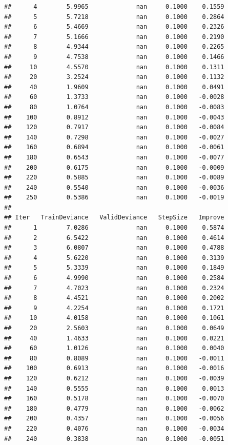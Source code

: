 \documentclass[
]{book}
\begin{document}
\begin{verbatim}
##      4        5.9965             nan     0.1000    0.1559
##      5        5.7218             nan     0.1000    0.2864
##      6        5.4669             nan     0.1000    0.2326
##      7        5.1666             nan     0.1000    0.2190
##      8        4.9344             nan     0.1000    0.2265
##      9        4.7538             nan     0.1000    0.1466
##     10        4.5570             nan     0.1000    0.1311
##     20        3.2524             nan     0.1000    0.1132
##     40        1.9609             nan     0.1000    0.0491
##     60        1.3733             nan     0.1000   -0.0028
##     80        1.0764             nan     0.1000   -0.0083
##    100        0.8912             nan     0.1000   -0.0043
##    120        0.7917             nan     0.1000   -0.0084
##    140        0.7298             nan     0.1000   -0.0027
##    160        0.6894             nan     0.1000   -0.0061
##    180        0.6543             nan     0.1000   -0.0077
##    200        0.6175             nan     0.1000   -0.0009
##    220        0.5885             nan     0.1000   -0.0089
##    240        0.5540             nan     0.1000   -0.0036
##    250        0.5386             nan     0.1000   -0.0019
## 
## Iter   TrainDeviance   ValidDeviance   StepSize   Improve
##      1        7.0286             nan     0.1000    0.5874
##      2        6.5422             nan     0.1000    0.4614
##      3        6.0807             nan     0.1000    0.4788
##      4        5.6220             nan     0.1000    0.3139
##      5        5.3339             nan     0.1000    0.1849
##      6        4.9990             nan     0.1000    0.2584
##      7        4.7023             nan     0.1000    0.2324
##      8        4.4521             nan     0.1000    0.2002
##      9        4.2254             nan     0.1000    0.1721
##     10        4.0158             nan     0.1000    0.1061
##     20        2.5603             nan     0.1000    0.0649
##     40        1.4633             nan     0.1000    0.0221
##     60        1.0126             nan     0.1000    0.0040
##     80        0.8089             nan     0.1000   -0.0011
##    100        0.6913             nan     0.1000   -0.0016
##    120        0.6212             nan     0.1000   -0.0039
##    140        0.5555             nan     0.1000    0.0013
##    160        0.5178             nan     0.1000   -0.0070
##    180        0.4779             nan     0.1000   -0.0062
##    200        0.4357             nan     0.1000   -0.0056
##    220        0.4076             nan     0.1000   -0.0034
##    240        0.3838             nan     0.1000   -0.0051

\end{verbatim}
\end{document}
